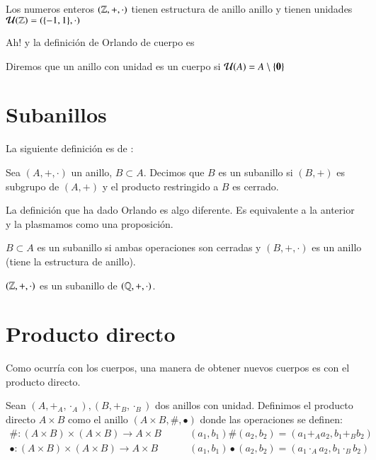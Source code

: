 \begin{ej}
	Los numeros enteros $(\mathbb{Z}, +, \cdot)$ tienen estructura de anillo anillo y tienen unidades $\mathcal{U}(\mathbb{Z}) = (\{-1, 1\}, \cdot)$
\end{ej}

Ah! y la definición de Orlando de cuerpo es

\begin{dfn}[Cuerpo]
	\label{dfn:cuerporlando}
	Diremos que un anillo con unidad es un cuerpo si $\mathcal{U}(A) = A \setminus \{\mathbf{0}\}$
\end{dfn}

\section{Subanillos}

La siguiente definición es de \cite{dor96}:

\begin{dfn}[Subanillo]
	Sea $(A, +, \cdot)$ un anillo, $B\subset A$. Decimos que $B$ es un subanillo si $(B, +)$ es subgrupo de  $(A, +)$ y el producto restringido a $B$ es cerrado.
\end{dfn}

La definición que ha dado Orlando es algo diferente. Es equivalente a la anterior y la plasmamos como una proposición.

\begin{pro}
	$B \subset A$ es un subanillo si ambas operaciones son cerradas y $(B, +, \cdot)$ es un anillo (tiene la estructura de anillo).
\end{pro}

\begin{ej}
	$(\mathbb{Z}, +, \cdot)$ es un subanillo de $(\mathbb{Q}, +, \cdot)$.
\end{ej}

\section{Producto directo}

Como ocurría con los cuerpos, una manera de obtener nuevos cuerpos es con el producto directo.

\begin{dfn}
	Sean $(A, +_A, \cdot_A), (B, +_B, \cdot_B)$ dos anillos con unidad. Definimos el producto directo $A \times B$ como el anillo $(A \times B, \#, \bullet)$ donde las operaciones se definen:
	\begin{align*}
	\# : (A\times B) \times (A\times B) \to A \times B\qquad &(a_1, b_1) \# (a_2, b_2) = (a_1 +_A a_2, b_1 +_B b_2) \\
	\bullet : (A\times B) \times (A\times B) \to A \times B\qquad &(a_1, b_1) \bullet (a_2, b_2) = (a_1 \cdot_A a_2, b_1 \cdot_B b_2)
	\end{align*}
\end{dfn}

